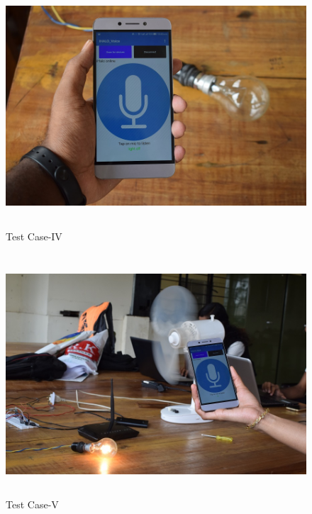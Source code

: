 \begin{figure}[H]
	
	\centering
	\includegraphics[width=\linewidth,height=9cm] {./images/p32.jpg}
	\caption{Test Case-IV}
	\label{manual}
\end{figure}

\begin{figure}[H]
	
	\centering
	\includegraphics[width=\linewidth,height=9cm] {./images/p33.jpg}
	\caption{Test Case-V}
	\label{manual}
\end{figure}


